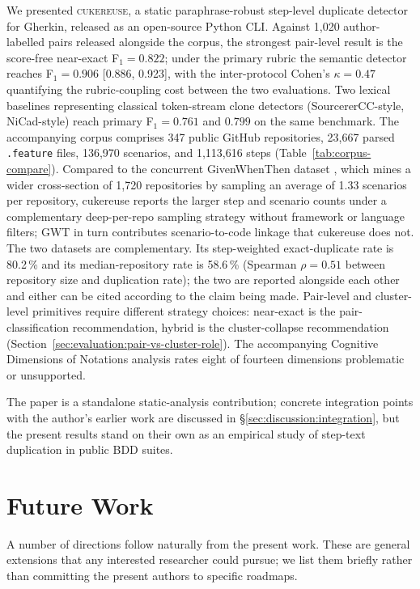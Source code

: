 \documentclass[11pt,a4paper]{article}
\newcommand{\tool}{\textsc{cukereuse}\xspace}
\begin{document}
We presented \tool, a static paraphrase-robust step-level duplicate
detector for Gherkin, released as an open-source Python CLI.
Against 1{,}020 author-labelled pairs released alongside the corpus,
the strongest pair-level result is the score-free near-exact
F$_1 = 0.822$; under the primary rubric the semantic detector
reaches F$_1 = 0.906$ [0.886, 0.923], with the inter-protocol
Cohen's $\kappa = 0.47$ quantifying the rubric-coupling cost between
the two evaluations. Two lexical
baselines representing classical token-stream clone detectors
(SourcererCC-style, NiCad-style) reach primary F$_1 = 0.761$ and
$0.799$ on the same benchmark. The accompanying corpus comprises 347 public GitHub repositories,
23{,}667 parsed \texttt{.feature} files, 136{,}970 scenarios, and
1{,}113{,}616 steps (Table~\ref{tab:corpus-compare}). Compared to
the concurrent GivenWhenThen dataset \citep{alcantara2026gwt},
which mines a wider cross-section of 1{,}720 repositories by
sampling an average of 1.33 scenarios per repository, cukereuse
reports the larger step and scenario counts under a
complementary deep-per-repo sampling strategy without
framework or language filters; GWT in turn contributes
scenario-to-code linkage that cukereuse does not. The two
datasets are complementary. Its step-weighted exact-duplicate rate is
80.2\,\% and its median-repository rate is 58.6\,\% (Spearman
$\rho = 0.51$ between repository size and duplication rate);
the two are reported alongside each other and either can be cited
according to the claim being made.
Pair-level and cluster-level primitives require
different strategy choices: near-exact is the pair-classification
recommendation, hybrid is the cluster-collapse recommendation
(Section~\ref{sec:evaluation:pair-vs-cluster-role}). The
accompanying Cognitive Dimensions of Notations analysis rates eight
of fourteen dimensions problematic or unsupported.

The paper is a standalone static-analysis contribution; concrete
integration points with the author's earlier work
\citep{mughal2024bdd,mughal2025rlagent,mughal2026networklayer} are
discussed in §\ref{sec:discussion:integration}, but the present
results stand on their own as an empirical study of step-text
duplication in public BDD suites.

\section{Future Work}
\label{sec:future}

A number of directions follow naturally from the present work.
These are general extensions that any interested researcher could
pursue; we list them briefly rather than committing the present
authors to specific roadmaps.
\end{document}
